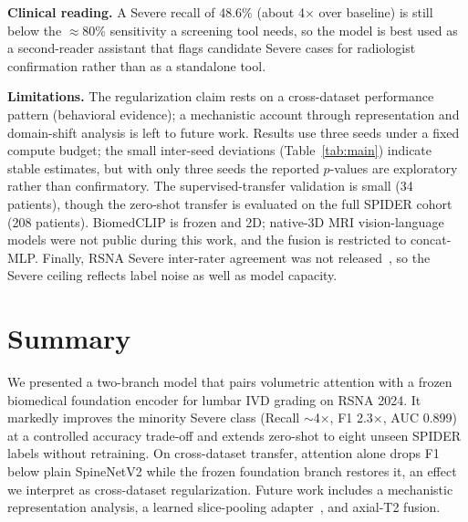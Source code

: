 \documentclass[runningheads]{llncs}
\begin{document}
\textbf{Clinical reading.} A Severe recall of 48.6\% (about 4$\times$ over baseline) is still below the $\approx$80\% sensitivity a screening tool needs, so the model is best used as a second-reader assistant that flags candidate Severe cases for radiologist confirmation rather than as a standalone tool.

\textbf{Limitations.} The regularization claim rests on a cross-dataset performance pattern (behavioral evidence); a mechanistic account through representation and domain-shift analysis is left to future work. Results use three seeds under a fixed compute budget; the small inter-seed deviations (Table~\ref{tab:main}) indicate stable estimates, but with only three seeds the reported $p$-values are exploratory rather than confirmatory. The supervised-transfer validation is small (34 patients), though the zero-shot transfer is evaluated on the full SPIDER cohort (208 patients). BiomedCLIP is frozen and 2D; native-3D MRI vision-language models were not public during this work, and the fusion is restricted to concat-MLP. Finally, RSNA Severe inter-rater agreement was not released~\cite{kaggle2024}, so the Severe ceiling reflects label noise as well as model capacity.

\section{Summary}\label{sec5}

We presented a two-branch model that pairs volumetric attention with a frozen biomedical foundation encoder for lumbar IVD grading on RSNA 2024. It markedly improves the minority Severe class (Recall $\sim$4$\times$, F1 2.3$\times$, AUC 0.899) at a controlled accuracy trade-off and extends zero-shot to eight unseen SPIDER labels without retraining. On cross-dataset transfer, attention alone drops F1 below plain SpineNetV2 while the frozen foundation branch restores it, an effect we interpret as cross-dataset regularization. Future work includes a mechanistic representation analysis, a learned slice-pooling adapter~\cite{lu2024radclip}, and axial-T2 fusion.

%


\end{document}
